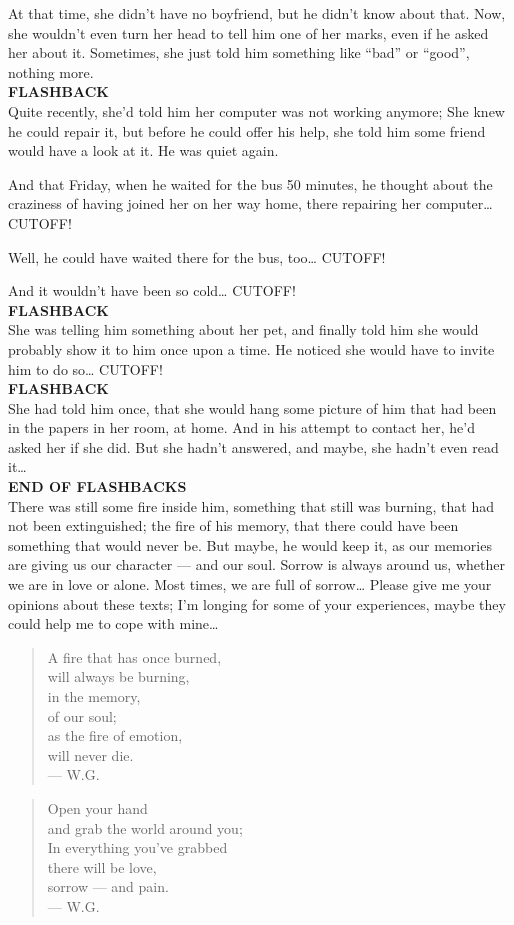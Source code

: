 At that time, she didn't have no boyfriend, but he didn't know about that. 
Now, she wouldn't even turn her head to tell him one of her marks, even if he asked her about it. 
Sometimes, she just told him something like \enquote{bad} or \enquote{good}, nothing more. \\
\textbf{FLASHBACK}\\
Quite recently, she'd told him her computer was not working anymore; She knew he could repair it, but before he could offer his help, she told him some friend would have a look at it. 
He was quiet again.

And that Friday, when he waited for the bus 50 minutes, he thought about the craziness of having joined her on her way home, there repairing her computer\ldots
CUTOFF!

Well, he could have waited there for the bus, too\ldots
CUTOFF!

And it wouldn't have been so cold\ldots
CUTOFF!\\
\textbf{FLASHBACK}\\
She was telling him something about her pet, and finally told him she would probably show it to him once upon a time. 
He noticed she would have to invite him to do so\ldots
CUTOFF!\\
\textbf{FLASHBACK}\\
She had told him once, that she would hang some picture of him that had been in the papers in her room, at home. 
And in his attempt to contact her, he'd asked her if she did. 
But she hadn't answered, and maybe, she hadn't even read it\ldots\\
\textbf{END OF FLASHBACKS}\\
There was still some fire inside him, something that still was burning, that had not been extinguished; the fire of his memory, that there could have been something that would never be. 
But maybe, he would keep it, as our memories are giving us our character --- and our soul. 
Sorrow is always around us, whether we are in love or alone. 
Most times, we are full of sorrow\ldots
Please give me your opinions about these texts; I'm longing for some of your experiences, maybe they could help me to cope with mine\ldots

\begin{quote}
A fire that has once burned, \\
will always be burning, \\
in the memory, \\
of our soul; \\
as the fire of emotion, \\
will never die. \\
--- W.G.
\end{quote}

\begin{quote}
Open your hand \\
and grab the world around you; \\
In everything you've grabbed \\
there will be love, \\
sorrow --- and pain. \\
--- W.G.
\end{quote}
